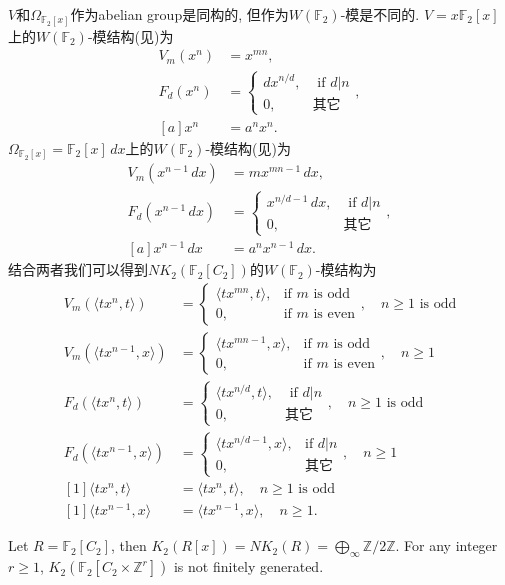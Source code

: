 $V$和$\Omega_{\mathbb{F}_2[x]}$作为abelian group是同构的, 但作为$W(\mathbb{F}_2)$-模是不同的. $V=x \mathbb{F}_2[x]$上的$W(\mathbb{F}_2)$-模结构(见\cite{MR96j:16008})为 
\begin{align*}
 V_m(x^n)&=x^{mn}, \\
 F_d(x^n)&=\begin{cases}
 	dx^{n/d},& \mbox{ if  $d|n$}\\
 	0,& \mbox{其它}
 \end{cases}, \\
 [a]x^n&=a^nx^n.
 \end{align*}
$\Omega_{\mathbb{F}_2[x]}=\mathbb{F}_2[x]\,dx $上的$W(\mathbb{F}_2)$-模结构(见\cite{MR96j:16008})为
\begin{align*}
 V_m(x^{n-1}\,dx)&=mx^{mn-1}\,dx, \\
 F_d(x^{n-1}\,dx)&=\begin{cases}
 	x^{n/d-1}\,dx,& \mbox{ if  $d|n$}\\
 	0,& \mbox{其它}
 \end{cases}, \\
 [a]x^{n-1}\,dx&=a^nx^{n-1}\,dx.
 \end{align*}
结合两者我们可以得到$NK_2(\mathbb{F}_2[C_2])$的$W(\mathbb{F}_2)$-模结构为
\begin{align*}
 V_m(\langle tx^n,t \rangle)&=\begin{cases}
 	\langle tx^{mn},t \rangle,& \mbox{if $m$ is odd }\\
 	0,& \mbox{if $m$ is even}
 \end{cases},\quad \mbox{$n\geq 1$ is odd} \\
  V_m(\langle tx^{n-1},x \rangle)&=\begin{cases}
 	\langle tx^{mn-1},x \rangle,& \mbox{if $m$ is odd }\\
 	0,& \mbox{if $m$ is even}
 \end{cases}
 ,\quad \mbox{$n\geq 1$} \\
 F_d(\langle tx^n,t \rangle)&=\begin{cases}
 	\langle tx^{n/d},t \rangle,& \mbox{ if $d|n$}\\
 	0,& \mbox{其它}
 \end{cases},\quad \mbox{$n\geq 1$ is odd} \\
 F_d(\langle tx^{n-1},x \rangle)&=\begin{cases}
 	\langle tx^{n/d-1},x \rangle,& \mbox{if $d|n$}\\
 	0,& \mbox{其它}
 \end{cases}
 ,\quad \mbox{$n\geq 1$} \\
 [1]\langle tx^n,t \rangle&=\langle tx^n,t \rangle,\quad \mbox{$n\geq 1$ is odd} \\
 [1]\langle tx^{n-1},x \rangle&=\langle tx^{n-1},x \rangle,\quad \mbox{$n\geq 1$}.
 \end{align*}
\begin{corollary}
	Let $R=\mathbb{F}_2[C_2]$, then $K_2(R[x])=NK_2(R)=\bigoplus_{\infty}\mathbb{Z}/2\mathbb{Z}$. For any integer $r\geq 1$, $K_2(\mathbb{F}_2[C_2\times \mathbb{Z}^r])$ is not finitely generated. 
\end{corollary}


